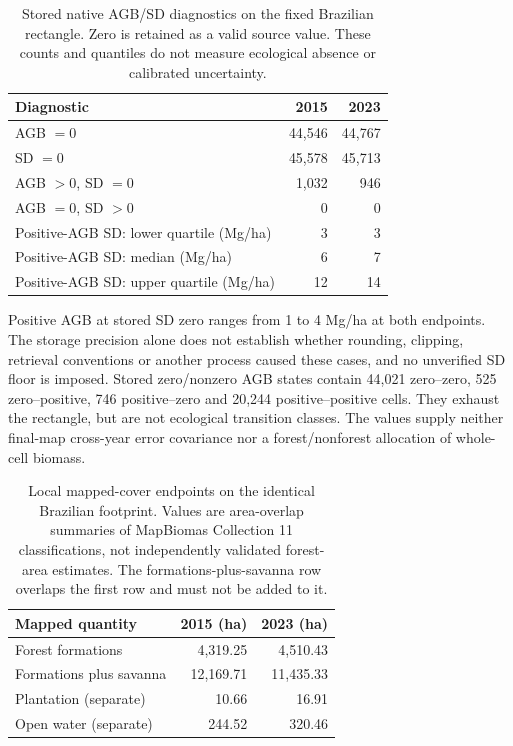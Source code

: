 \documentclass[11pt,a4paper]{article}
\begin{document}
\begin{table}[htbp]
\centering\small
\caption{Stored native AGB/SD diagnostics on the fixed Brazilian rectangle. Zero is retained as a valid source value. These counts and quantiles do not measure ecological absence or calibrated uncertainty.}\label{tab:native_sd}
\begin{tabular}{lrr}
\toprule
Diagnostic & 2015 & 2023\\\midrule
AGB $=0$ & 44,546 & 44,767\\
SD $=0$ & 45,578 & 45,713\\
AGB $>0$, SD $=0$ & 1,032 & 946\\
AGB $=0$, SD $>0$ & 0 & 0\\
Positive-AGB SD: lower quartile (Mg/ha) & 3 & 3\\
Positive-AGB SD: median (Mg/ha) & 6 & 7\\
Positive-AGB SD: upper quartile (Mg/ha) & 12 & 14\\\bottomrule
\end{tabular}
\end{table}

Positive AGB at stored SD zero ranges from 1 to 4 Mg/ha at both endpoints. The storage precision alone does not establish whether rounding, clipping, retrieval conventions or another process caused these cases, and no unverified SD floor is imposed. Stored zero/nonzero AGB states contain 44,021 zero--zero, 525 zero--positive, 746 positive--zero and 20,244 positive--positive cells. They exhaust the rectangle, but are not ecological transition classes. The values supply neither final-map cross-year error covariance nor a forest/nonforest allocation of whole-cell biomass.

\begin{table}[htbp]
\centering\small
\caption{Local mapped-cover endpoints on the identical Brazilian footprint. Values are area-overlap summaries of MapBiomas Collection 11 classifications, not independently validated forest-area estimates. The formations-plus-savanna row overlaps the first row and must not be added to it.}\label{tab:brazil_cover}
\begin{tabular}{lrr}
\toprule
Mapped quantity & 2015 (ha) & 2023 (ha)\\\midrule
Forest formations & 4,319.25 & 4,510.43 \\
Formations plus savanna & 12,169.71 & 11,435.33 \\
Plantation (separate) & 10.66 & 16.91 \\
Open water (separate) & 244.52 & 320.46 \\
\bottomrule
\end{tabular}
\end{table}
\end{document}
